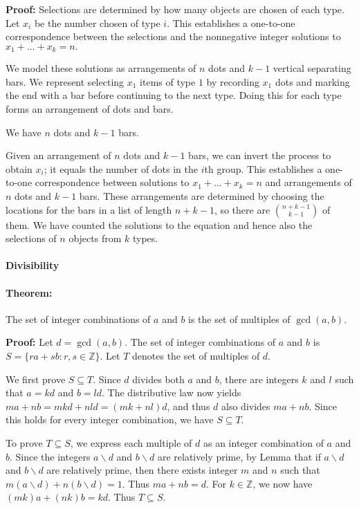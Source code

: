 \documentclass[a4paper, 11pt, twoside]{article}
\begin{document}
\textbf{Proof:} Selections are determined by how many objects are chosen of each type. Let $x_i$ be the number chosen of type $i$. This establishes a one-to-one correspondence between the selections and the nonnegative integer solutions to $x_1+\dots +x_k=n.$

We model these solutions as arrangements of $n$ dots and $k-1$ vertical separating bars. We represent selecting $x_1$ items of type $1$ by recording $x_1$ dots and marking the end with a bar before continuing to the next type. Doing this for each type forms an arrangement of dots and bars.

We have $n$ dots and $k-1$ bars.

Given an arrangement of $n$ dots and $k-1$ bars, we can invert the process to obtain $x_i$; it equals the number of dots in the $i$th group. This establishes a one-to-one correspondence between solutions to $x_1+\dots +x_k=n$ and arrangements of $n$ dots and $k-1$ bars. These arrangements are determined by choosing the locations for the bars in a list of length $n+k-1$, so there are ${n+k-1\choose k-1}$ of them. We have counted the solutions to the equation and hence also the selections of $n$ objects from $k$ types.\\

\paragraph{Divisibility}

\paragraph{Theorem:} The set of integer combinations of $a$ and $b$ is the set of multiples of $\gcd(a,b)$.

\textbf{Proof:} Let $d=\gcd(a,b)$. The set of integer combinations of $a$ and $b$ is $S=\{ra+sb: r,s \in \mathbb{Z}\}$. Let $T$ denotes the set of multiples of $d$.

We first prove $S\subseteq T$. Since $d$ divides both $a$ and $b$, there are integers $k$ and $l$ such that $a=kd$ and $b=ld$. The distributive law now yields $ma+nb=mkd+nld=(mk+nl)d$, and thus $d$ also divides $ma+nb$. Since this holds for every integer combination, we have $S\subseteq T$.

To prove $T\subseteq S$, we express each multiple of $d$ as an integer combination of $a$ and $b$. Since the integers $a\backslash d$ and $b\backslash d$ are relatively prime, by Lemma that if $a\backslash d$ and $b\backslash d$ are relatively prime, then there exists integer $m$ and $n$ such that $m(a\backslash d)+n(b\backslash d)=1$. Thus $ma+nb=d$. For $k\in \mathbb{Z}$, we now have $(mk)a+(nk)b=kd$. Thus $T\subseteq S$.
\end{document}
